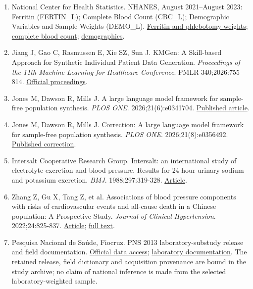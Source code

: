 \documentclass[11pt,letterpaper]{article}
\begin{document}
\begin{enumerate}[label=\arabic*.,leftmargin=2.1em,itemsep=.2em,parsep=0pt]
\item National Center for Health Statistics. NHANES, August 2021–\allowbreak{}August 2023: Ferritin (FERTIN\_L); Complete Blood Count (CBC\_L); Demographic Variables and Sample Weights (DEMO\_L). \href{https://wwwn.cdc.gov/Nchs/Data/Nhanes/Public/2021/DataFiles/FERTIN\_L.htm}{Ferritin and phlebotomy weights}; \href{https://wwwn.cdc.gov/Nchs/Data/Nhanes/Public/2021/DataFiles/CBC\_L.htm}{complete blood count}; \href{https://wwwn.cdc.gov/Nchs/Data/Nhanes/Public/2021/DataFiles/DEMO\_L.htm}{demographics}.

\item Jiang J, Gao C, Rasmussen E, Xie SZ, Sun J. KMGen: A Skill-based Approach for Synthetic Individual Patient Data Generation. \emph{Proceedings of the 11th Machine Learning for Healthcare Conference}. PMLR 340;2026:755–\allowbreak{}814. \href{https://proceedings.mlr.press/v340/jiang26a.html}{Official proceedings}.

\item Jones M, Dawson R, Mills J. A large language model framework for sample-free population synthesis. \emph{PLOS ONE}. 2026;21(6):e0341704. \href{https://journals.plos.org/plosone/article?id=10.1371/journal.pone.0341704}{Published article}.

\item Jones M, Dawson R, Mills J. Correction: A large language model framework for sample-free population synthesis. \emph{PLOS ONE}. 2026;21(8):e0356492. \href{https://journals.plos.org/plosone/article?id=10.1371/journal.pone.0356492}{Published correction}.

\item Intersalt Cooperative Research Group. Intersalt: an international study of electrolyte excretion and blood pressure. Results for 24 hour urinary sodium and potassium excretion. \emph{BMJ}. 1988;297:319-328. \href{https://doi.org/10.1136/bmj.297.6644.319}{Article}.

\item Zhang Z, Gu X, Tang Z, et al. Associations of blood pressure components with risks of cardiovascular events and all-cause death in a Chinese population: A Prospective Study. \emph{Journal of Clinical Hypertension}. 2022;24:825-837. \href{https://doi.org/10.1111/jch.14529}{Article}; \href{https://pmc.ncbi.nlm.nih.gov/articles/PMC9278591/}{full text}.

\item Pesquisa Nacional de Saúde, Fiocruz. PNS 2013 laboratory-substudy release and field documentation. \href{https://www.pns.icict.fiocruz.br/bases-de-dados/}{Official data access}; \href{https://www.pns.icict.fiocruz.br/exames-laboratoriais/}{laboratory documentation}. The retained release, field dictionary and acquisition provenance are bound in the study archive; no claim of national inference is made from the selected laboratory-weighted sample.


\end{enumerate}
\end{document}
